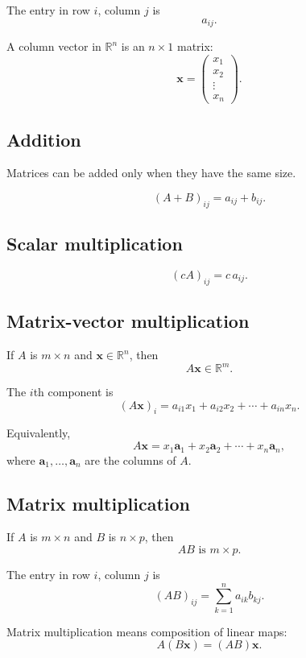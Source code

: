 The entry in row \(i\), column \(j\) is
\[
\boxed{
    a_{ij}.
}
\]

A column vector in \(\mathbb R^n\) is an \(n\times1\) matrix:
\[
\boxed{
    \mathbf x=
    \begin{pmatrix}
    x_1\\
    x_2\\
    \vdots\\
    x_n
    \end{pmatrix}.
}
\]

\subsection*{Addition}

Matrices can be added only when they have the same size.

\[
\boxed{
    (A+B)_{ij}=a_{ij}+b_{ij}.
}
\]

\subsection*{Scalar multiplication}

\[
\boxed{
    (cA)_{ij}=c\,a_{ij}.
}
\]

\subsection*{Matrix-vector multiplication}

If \(A\) is \(m\times n\) and \(\mathbf x\in\mathbb R^n\), then
\[
\boxed{
    A\mathbf x\in\mathbb R^m.
}
\]

The \(i\)th component is
\[
\boxed{
    (A\mathbf x)_i
    =
    a_{i1}x_1+a_{i2}x_2+\cdots+a_{in}x_n.
}
\]

Equivalently,
\[
\boxed{
    A\mathbf x
    =
    x_1\mathbf a_1+x_2\mathbf a_2+\cdots+x_n\mathbf a_n,
}
\]
where \(\mathbf a_1,\ldots,\mathbf a_n\) are the columns of \(A\).

\subsection*{Matrix multiplication}

If \(A\) is \(m\times n\) and \(B\) is \(n\times p\), then
\[
\boxed{
    AB\text{ is }m\times p.
}
\]

The entry in row \(i\), column \(j\) is
\[
\boxed{
    (AB)_{ij}
    =
    \sum_{k=1}^{n}a_{ik}b_{kj}.
}
\]

Matrix multiplication means composition of linear maps:
\[
\boxed{
    A(B\mathbf x)=(AB)\mathbf x.
}
\]

